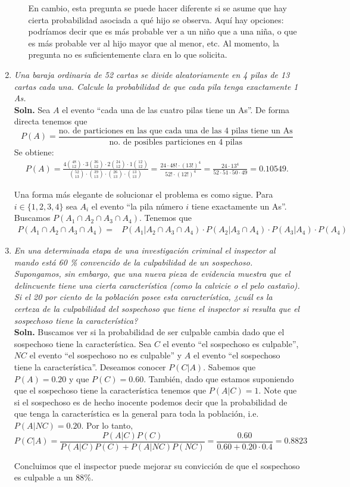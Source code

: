 \documentclass[letterpaper,11pt]{article}
\begin{document}
\begin{enumerate}
\begin{itemize}
        En cambio, esta pregunta se puede hacer diferente si se asume que hay cierta probabilidad asociada a
        qué hijo se observa. Aquí hay opciones: podríamos decir que es más probable ver a un niño que a una
        niña, o que es más probable ver al hijo mayor que al menor, etc. Al momento, la pregunta no es
        suficientemente clara en lo que solicita.
\end{itemize}
\item \emph{Una baraja ordinaria de 52 cartas se divide aleatoriamente en 4 pilas de 13 cartas cada una.
    Calcule la probabilidad de que cada pila tenga exactamente 1 As.}\\
    {\bf Soln.} Sea $A$ el evento ``cada una de las cuatro pilas tiene un As''. De forma directa tenemos que
    \[P(A)=\frac{\text{no. de particiones en las que cada una de las 4 pilas tiene un As}}
        {\text{no. de posibles particiones en 4 pilas}}\]
    Se obtiene:
    \begin{align*}
        P(A)=\frac{4\binom{48}{12}\cdot 3\binom{36}{12}\cdot 2 \binom{24}{12}\cdot 1\binom{12}{12}}
        {\binom{52}{13}\cdot \binom{39}{13}\cdot \binom{26}{13}\cdot \binom {13}{13}} = \frac{24\cdot
        48!\cdot (13!)^4}{52!\cdot (12!)^4}=\frac{24\cdot 13^4}{52\cdot 51\cdot 50\cdot 49}=0.10549.
    \end{align*}
    
    Una forma más elegante de solucionar el problema es como sigue.
    Para $i\in \{1,2,3,4\}$ sea $A_i$ el evento ``la pila número $i$ tiene exactamente un As''. Buscamos
    $P(A_1\cap A_2\cap A_3\cap A_4)$. Tenemos que
    \begin{align*}
        P(A_1\cap A_2\cap A_3\cap A_4)  = & P(A_1|A_2\cap A_3\cap A_4)\cdot P(A_2|A_3\cap A_4)\cdot
        P(A_3|A_4)\cdot P(A_4)
    \end{align*}
\item \emph{En una determinada etapa de una investigación criminal el inspector al mando está 60 \%
convencido de la culpabilidad de un sospechoso. Supongamos, sin embargo, que una nueva
pieza de evidencia muestra que el delincuente tiene una cierta característica (como la calvicie
o el pelo castaño). Si el 20 por ciento de la población posee esta característica, ¿cuál es la
certeza de la culpabilidad del sospechoso que tiene el inspector si resulta que el sospechoso
tiene la característica?}\\
{\bf Soln.} Buscamos ver si la probabilidad de ser culpable cambia dado que el sospechoso tiene la
característica. Sea $C$ el evento ``el sospechoso es culpable'', $NC$ el evento ``el sospechoso no es
culpable'' y $A$ el evento ``el sospechoso tiene la característica''. Deseamos conocer $P(C|A)$. 
Sabemos que $P(A)=0.20$ y que $P(C)=0.60$. También, dado que estamos suponiendo que el sospechoso tiene 
la característica tenemos que $P(A|C)=1$.  Note que si el sospechoso es de hecho inocente podemos decir
que la probabilidad de que tenga la característica es la general para toda la población, i.e. $P(A|NC)=0.20$.
Por lo tanto,
\[P(C|A)=\frac{P(A|C)P(C)}{P(A|C)P(C)+P(A|NC)P(NC)}=\frac{0.60}{0.60+0.20\cdot 0.4}=0.8823  \]

Concluimos que el inspector puede mejorar su convicción de que el sospechoso es culpable a un 88\%.
\end{enumerate}
\end{document}
